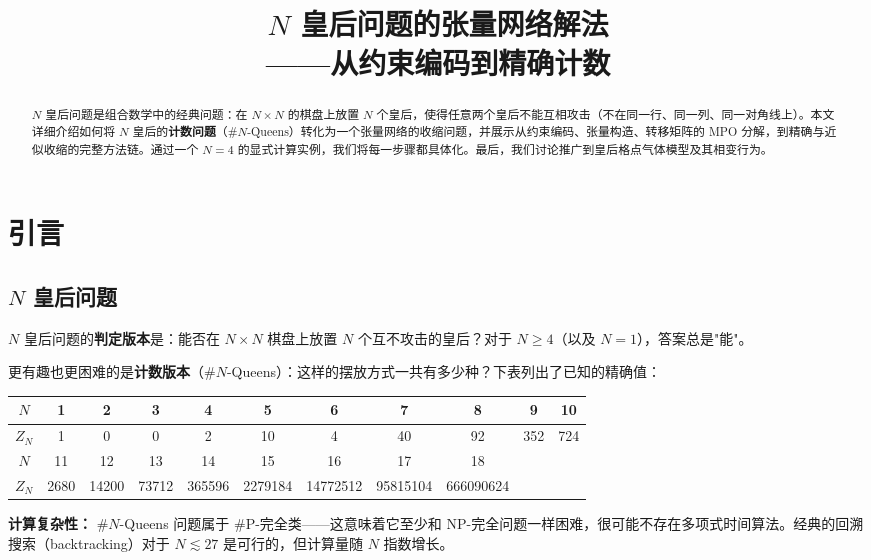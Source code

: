 \documentclass[12pt,a4paper]{ctexart}
\title{\textbf{$N$ 皇后问题的张量网络解法\\——从约束编码到精确计数}}
\author{}
\date{}
\begin{document}
\maketitle
\thispagestyle{empty}

\begin{abstract}
$N$ 皇后问题是组合数学中的经典问题：在 $N \times N$ 的棋盘上放置 $N$ 个皇后，使得任意两个皇后不能互相攻击（不在同一行、同一列、同一对角线上）。本文详细介绍如何将 $N$ 皇后的\textbf{计数问题}（\#$N$-Queens）转化为一个张量网络的收缩问题，并展示从约束编码、张量构造、转移矩阵的 MPO 分解，到精确与近似收缩的完整方法链。通过一个 $N=4$ 的显式计算实例，我们将每一步骤都具体化。最后，我们讨论推广到皇后格点气体模型及其相变行为。
\end{abstract}

\tableofcontents
\newpage

\section{引言}

\subsection{$N$ 皇后问题}

$N$ 皇后问题的\textbf{判定版本}是：能否在 $N \times N$ 棋盘上放置 $N$ 个互不攻击的皇后？对于 $N \geq 4$（以及 $N=1$），答案总是"能"。

更有趣也更困难的是\textbf{计数版本}（\#$N$-Queens）：这样的摆放方式一共有多少种？下表列出了已知的精确值：

\begin{center}
\renewcommand{\arraystretch}{1.2}
\begin{tabular}{c|cccccccccc}
\hline
$N$ & 1 & 2 & 3 & 4 & 5 & 6 & 7 & 8 & 9 & 10 \\
\hline
$Z_N$ & 1 & 0 & 0 & 2 & 10 & 4 & 40 & 92 & 352 & 724 \\
\hline\hline
$N$ & 11 & 12 & 13 & 14 & 15 & 16 & 17 & 18 & & \\
\hline
$Z_N$ & 2680 & 14200 & 73712 & 365596 & 2279184 & 14772512 & 95815104 & 666090624 & & \\
\hline
\end{tabular}
\end{center}

\textbf{计算复杂性：} \#$N$-Queens 问题属于 \#P-完全类——这意味着它至少和 NP-完全问题一样困难，很可能不存在多项式时间算法。经典的回溯搜索（backtracking）对于 $N \lesssim 27$ 是可行的，但计算量随 $N$ 指数增长。
\end{document}
